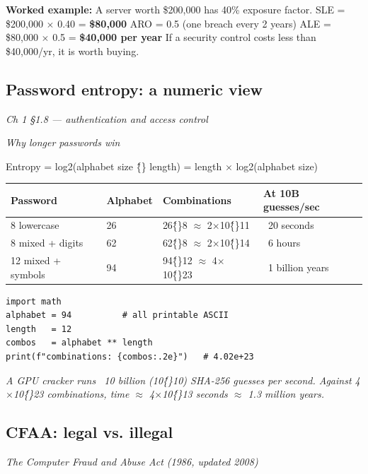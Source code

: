 \documentclass[12pt,openany]{book}
\begin{document}
\textbf{Worked example:} A server worth \$200,000 has 40\% exposure factor.
SLE = \$200,000 $\times$ 0.40 = \textbf{\$80,000}
ARO = 0.5 (one breach every 2 years)
ALE = \$80,000 $\times$ 0.5 = \textbf{\$40,000 per year}
If a security control costs less than \$40,000/yr, it is worth buying.

\medskip

\subsection*{Password entropy: a numeric view}
{\small\itshape\color{gray}Ch 1 §1.8 --- authentication and access control}

{\small\itshape\color{gray}Why longer passwords win}

Entropy = log2(alphabet size \^\{\} length) = length $\times$ log2(alphabet size)


\begin{center}\small\begin{tabular}{p{3.2cm}p{3.2cm}p{3.2cm}p{3.2cm}}\toprule
\textbf{Password} & \textbf{Alphabet} & \textbf{Combinations} & \textbf{At 10B guesses/sec} \\ \midrule
8 lowercase & 26 & 26\^\{\}8 $\approx$ 2$\times$10\^\{\}11 & ~20 seconds \\
8 mixed + digits & 62 & 62\^\{\}8 $\approx$ 2$\times$10\^\{\}14 & ~6 hours \\
12 mixed + symbols & 94 & 94\^\{\}12 $\approx$ 4$\times$10\^\{\}23 & ~1 billion years \\
\bottomrule\end{tabular}\end{center}


\begin{lstlisting}
import math
alphabet = 94          # all printable ASCII
length   = 12
combos   = alphabet ** length
print(f"combinations: {combos:.2e}")   # 4.02e+23\end{lstlisting}

{\small\itshape\color{gray}A GPU cracker runs ~10 billion (10\^\{\}10) SHA-256 guesses per second. Against 4$\times$10\^\{\}23 combinations, time $\approx$ 4$\times$10\^\{\}13 seconds $\approx$ 1.3 million years.}

\medskip

\subsection*{CFAA: legal vs. illegal}
{\small\itshape\color{gray}The Computer Fraud and Abuse Act (1986, updated 2008)}
\end{document}
